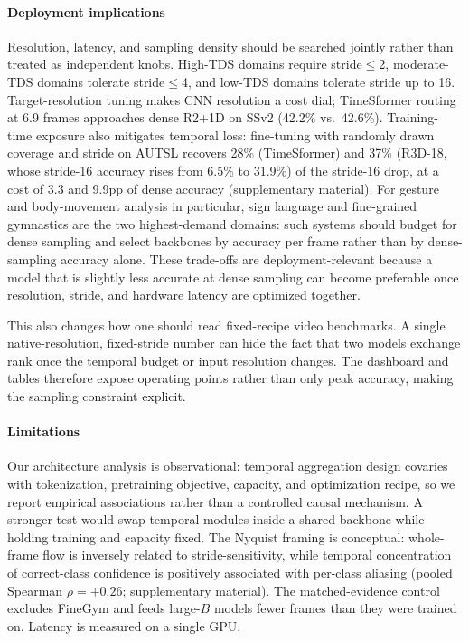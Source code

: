 \documentclass[a4paper, 10pt, conference]{ieeeconf}
\newcommand{\TDS}{\textsc{TDS}}
\begin{document}
\paragraph{Deployment implications}
Resolution, latency, and sampling density should be searched jointly rather than treated as independent knobs. High-\TDS{} domains require stride$\leq$2, moderate-\TDS{} domains tolerate stride$\leq$4, and low-\TDS{} domains tolerate stride up to 16. Target-resolution tuning makes CNN resolution a cost dial; TimeSformer routing at 6.9 frames approaches dense R2+1D on SSv2 (42.2\% vs.\ 42.6\%). Training-time exposure also mitigates temporal loss: fine-tuning with randomly drawn coverage and stride on AUTSL recovers 28\% (TimeSformer) and 37\% (R3D-18, whose stride-16 accuracy rises from 6.5\% to 31.9\%) of the stride-16 drop, at a cost of 3.3 and 9.9pp of dense accuracy (supplementary material). For gesture and body-movement analysis in particular, sign language and fine-grained gymnastics are the two highest-demand domains: such systems should budget for dense sampling and select backbones by accuracy per frame rather than by dense-sampling accuracy alone. These trade-offs are deployment-relevant because a model that is slightly less accurate at dense sampling can become preferable once resolution, stride, and hardware latency are optimized together.

This also changes how one should read fixed-recipe video benchmarks. A single native-resolution, fixed-stride number can hide the fact that two models exchange rank once the temporal budget or input resolution changes. The dashboard and tables therefore expose operating points rather than only peak accuracy, making the sampling constraint explicit.

\paragraph{Limitations}
Our architecture analysis is observational: temporal aggregation design covaries with tokenization, pretraining objective, capacity, and optimization recipe, so we report empirical associations rather than a controlled causal mechanism. A stronger test would swap temporal modules inside a shared backbone while holding training and capacity fixed. The Nyquist framing is conceptual: whole-frame flow is inversely related to stride-sensitivity, while temporal concentration of correct-class confidence is positively associated with per-class aliasing (pooled Spearman $\rho=+0.26$; supplementary material). The matched-evidence control excludes FineGym and feeds large-$B$ models fewer frames than they were trained on. Latency is measured on a single GPU.
\end{document}
